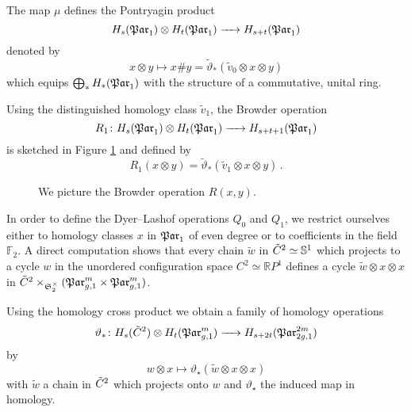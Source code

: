 \begin{defcor}
    \label{homology_operations:parallel_patching_slit_pics:pontryagin_product}
    The map $\mu$ defines the Pontryagin product
    \[
        H_s( \mathfrak{Par}_1) \otimes H_t( \mathfrak{Par}_1) \xrightarrow{\hspace{6pt}{}\hspace{6pt}} H_{s+t}( \mathfrak{Par}_1)
    \]
    denoted by
    \[
        x \otimes y \mapsto x \# y = \tilde\vartheta_\ast( \tilde v_0 \otimes x \otimes y )
    \]
    which equips $\bigoplus_\ast H_\ast( \mathfrak{Par}_1)$ with the structure of a commutative, unital ring.
\end{defcor}
\begin{defi}
    \label{homology_operations:parallel_patching_slit_pics:browder_operation}
    Using the distinguished homology class $\tilde v_1$, the Browder operation
    \[
        R_1 \colon H_s( \mathfrak{Par}_1) \otimes H_t( \mathfrak{Par}_1) \xrightarrow{\hspace{6pt}{}\hspace{6pt}} H_{s+t+1}( \mathfrak{Par}_1)
    \]
    is sketched in Figure \ref{homology_operations:parallel_patching_slit_pics:tilde_v_1_applied} and defined by
    \[
        R_1(x \otimes y) = \tilde\vartheta_\ast( \tilde v_1 \otimes x \otimes y ) \,.
    \]
\end{defi}
\begin{figure}[ht]
    \centering
    \def\svgwidth{.2\columnwidth}
    
    \caption{\label{homology_operations:parallel_patching_slit_pics:tilde_v_1_applied}We picture the Browder operation $R(x,y)$.}
\end{figure}

In order to define the Dyer--Lashof operations $Q_0$ and $Q_1$, we restrict ourselves either to homology classes $x$ in $\mathfrak{Par}_1$ of even degree or to coefficients in the field $\mathbb F_2$.
A direct computation shows that every chain $\tilde w$ in ${\tilde C^{2}} \simeq \mathbb S^1$ which projects to a cycle $w$ in the unordered configuration space $C^2 \simeq \mathbb RP^1$
defines a cycle $\tilde w \otimes x \otimes x$ in ${\tilde C^{2}} \times_{\mathfrak S^\times_2} (\mathfrak{Par}_{g,1}^m \times \mathfrak{Par}_{g,1}^m)$.
\begin{defi}
    Using the homology cross product we obtain a family of homology operations
    \[
        \vartheta_\ast \colon H_s({\tilde C^{2}}) \otimes H_t( \mathfrak{Par}_{g,1}^m ) \xrightarrow{\hspace{6pt}{}\hspace{6pt}} H_{s+2t}(\mathfrak{Par}_{2g,1}^{2m})
    \]
    by
    \[
        w \otimes x \mapsto \vartheta_{\star}( \tilde w \otimes x \otimes x )
    \]
    with $\tilde w$ a chain in ${\tilde C^{2}}$ which projects onto $w$ and $\vartheta_{\star}$ the induced map in homology.
\end{defi}

